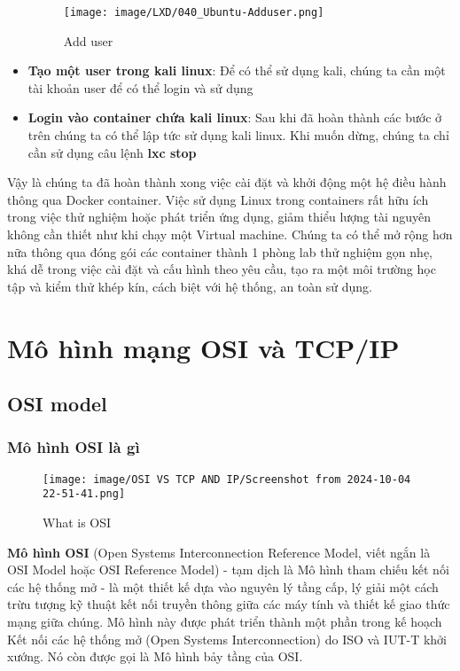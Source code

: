 \documentclass[a4paper,12pt]{article}
\begin{document}
\begin{itemize}
\begin{figure}[htbp]
    \centering
    \texttt{[image: image/LXD/040\_Ubuntu-Adduser.png]}
    \caption{Add user}
    \label{}
\end{figure}




\item \textbf{Tạo một user trong kali linux}: Để  có thể  sử  dụng kali, chúng ta cần một tài khoản user để có thể  login và sử dụng





\item \textbf{Login vào container chứa kali linux}: Sau khi đã hoàn thành các bước ở trên chúng ta có thể  lập tức sử dụng kali linux. Khi muốn dừng, chúng ta chỉ cần sử dụng câu lệnh \textbf{lxc stop} 

    
\end{itemize}



Vậy là chúng ta đã hoàn thành xong việc cài đặt và khởi động một hệ điều hành thông qua Docker container. Việc sử  dụng Linux trong containers rất hữu ích trong việc thử nghiệm hoặc phát triển ứng dụng, giảm thiểu lượng tài nguyên không cần thiết như khi chạy một Virtual machine. Chúng ta có thể mở rộng hơn nữa thông qua đóng gói các container thành 1 phòng lab thử  nghiệm gọn nhẹ, khá dễ  trong việc cài đặt và cấu hình theo yêu cầu, tạo ra một môi trường học tập và kiểm thử khép kín, cách biệt với hệ thống, an toàn sử dụng.












\section{Mô hình mạng OSI và TCP/IP }
\subsection{OSI model}
\subsubsection{Mô hình OSI là gì}
\begin{figure}[htbp]
    \centering
    \texttt{[image: image/OSI VS TCP AND IP/Screenshot from 2024-10-04 22-51-41.png]}
    \caption{What is OSI}
    \label{}
\end{figure}
\textbf{Mô hình OSI} (Open Systems Interconnection Reference Model, viết ngắn là OSI Model hoặc OSI Reference Model) - tạm dịch là Mô hình tham chiếu kết nối các hệ thống mở - là một thiết kế dựa vào nguyên lý tầng cấp, lý giải một cách trừu tượng kỹ thuật kết nối truyền thông giữa các máy tính và thiết kế giao thức mạng giữa chúng. Mô hình này được phát triển thành một phần trong kế hoạch Kết nối các hệ thống mở (Open Systems Interconnection) do ISO và IUT-T khởi xướng. Nó còn được gọi là Mô hình bảy tầng của OSI.
\end{document}
